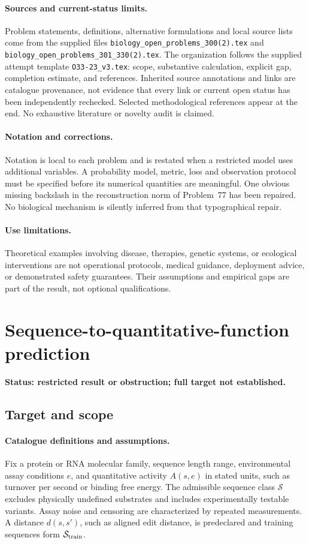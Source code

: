 \documentclass[11pt]{article}
\begin{document}
\paragraph{Sources and current-status limits.}
Problem statements, definitions, alternative formulations and local source lists
come from the supplied files
\texttt{biology\_open\_problems\_300(2).tex} and
\texttt{biology\_open\_problems\_301\_330(2).tex}.
The organization follows the supplied attempt template
\texttt{O33-23\_v3.tex}: scope, substantive calculation, explicit gap,
completion estimate, and references. Inherited source annotations and links are
catalogue provenance, not evidence that every link or current open status has
been independently rechecked. Selected methodological references appear at the
end. No exhaustive literature or novelty audit is claimed.

\paragraph{Notation and corrections.}
Notation is local to each problem and is restated when a restricted model uses
additional variables. A probability model, metric, loss and observation protocol
must be specified before its numerical quantities are meaningful. One obvious
missing backslash in the reconstruction norm of Problem~77 has been repaired.
No biological mechanism is silently inferred from that typographical repair.

\paragraph{Use limitations.}
Theoretical examples involving disease, therapies, genetic systems, or ecological
interventions are not operational protocols, medical guidance, deployment advice,
or demonstrated safety guarantees. Their assumptions and empirical gaps are part
of the result, not optional qualifications.


\section*{Sequence-to-quantitative-function prediction}
\label{prob:062}
\noindent\textbf{Status: restricted result or obstruction; full target not established.}
\subsection{Target and scope}
\paragraph{Catalogue definitions and assumptions.}
Fix a protein or RNA molecular family, sequence length range, environmental assay conditions $e$, and quantitative activity $A(s,e)$ in stated units, such as turnover per second or binding free energy. The admissible sequence class $\mathcal S$ excludes physically undefined substrates and includes experimentally testable variants. Assay noise and censoring are characterized by repeated measurements. A distance $d(s,s')$, such as aligned edit distance, is predeclared and training sequences form $\mathcal S_{\rm train}$.
\end{document}
